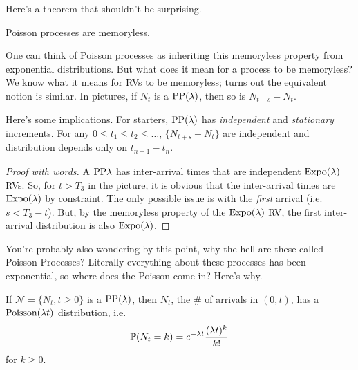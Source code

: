 \documentclass[11 pt]{scrartcl}
\begin{document}
Here's a theorem that shouldn't be surprising. 
\begin{theorem}
    Poisson processes are memoryless. 
\end{theorem}

One can think of Poisson processes as inheriting this memoryless property from exponential distributions. But what does it mean for a process to be memoryless? We know what it means for RVs to be memoryless; turns out the equivalent notion is similar. In pictures, if $N_t$ is a $\text{PP}(\lambda)$, then so is $N_{t+s} - N_t$. 

Here's some implications. For starters, $\text{PP}(\lambda)$ has \emph{independent} and \emph{stationary} increments. For any $0\leq t_1 \leq t_2 \leq \dots$, $\{N_{t+s} - N_t\}$ are independent and distribution depends only on $t_{n+1} - t_n$. 

\begin{proof}[Proof with words]
    A $\text{PP}{\lambda}$ has inter-arrival times that are independent $\text{Expo}(\lambda)$ RVs. So, for $t > T_3$ in the picture, it is obvious that the inter-arrival times are $\text{Expo}(\lambda)$ by constraint. The only possible issue is with the \emph{first} arrival (i.e. $s < T_3 - t$). But, by the memoryless property of the $\text{Expo}(\lambda)$ RV, the first inter-arrival distribution is also $\text{Expo}(\lambda)$. 
\end{proof}

You're probably also wondering by this point, why the hell are these called Poisson Processes? Literally everything about these processes has been exponential, so where does the Poisson come in? Here's why. 

\begin{theorem}[Walrand 13.7]
    If $\mathcal{N} = \{N_t, t\geq 0\}$ is a $\text{PP}(\lambda)$, then $N_t$, the \# of arrivals in $(0,t)$, has a $\text{Poisson}(\lambda t)$ distribution, i.e. 
    \[ \mathbb P(N_t = k) = e^{-\lambda t} \dfrac{(\lambda t)^k}{k!} \] 
        for $k \geq 0$.
\end{theorem}
\end{document}
